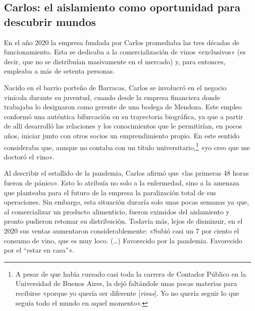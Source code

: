 \begin{refsection}
\subsection[Carlos: el aislamiento como oportunidad para descubrir mundos]{Carlos: el aislamiento como oportunidad para descubrir mundos}
\label{cap-30.carlos-el-aislamiento-como-oportunidad-para-descubrir-mundos}
En el año 2020 la empresa fundada por Carlos promediaba las tres décadas de funcionamiento. Esta se dedicaba a la comercialización de vinos «exclusivos» (es decir, que no se distribuían masivamente en el mercado) y, para entonces, empleaba a más de setenta personas.

Nacido en el barrio porteño de Barracas, Carlos se involucró en el negocio vinícola durante su juventud, cuando desde la empresa financiera donde trabajaba lo designaron como gerente de una bodega de Mendoza. Este empleo conformó una auténtica bifurcación en su trayectoria biográfica, ya que a partir de allí desarrolló las relaciones y los conocimientos que le permitirían, en pocos años, iniciar junto con otros socios un emprendimiento propio. En este sentido consideraba que, aunque no contaba con un título universitario,\footnote{A pesar de que había cursado casi toda la carrera de Contador Público
        en la Universidad de Buenos Aires, la dejó faltándole unas pocas
        materias para recibirse «porque yo quería ser diferente
        [\emph{risas}]. Yo no quería seguir lo que seguía todo
        el mundo en aquel momento».} «yo creo que me doctoró el vino».

Al describir el estallido de la pandemia, Carlos afirmó que «las primeras 48 horas fueron de pánico». Esto lo atribuía no solo a la enfermedad, sino a la amenaza que planteaba para el futuro de la empresa la paralización total de sus operaciones. Sin embargo, esta situación duraría solo unas pocas semanas ya que, al comercializar un producto alimenticio, fueron eximidos del aislamiento y pronto pudieron retomar su distribución. Todavía más, lejos de disminuir, en el 2020 sus ventas aumentaron considerablemente: «Subió casi un 7 por ciento el consumo de vino, que es muy loco. (…) Favorecido por la pandemia. Favorecido por el “estar en casa”».


\end{refsection}
